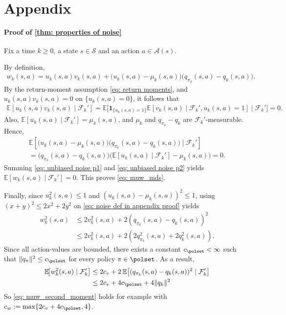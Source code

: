 \section*{Appendix}
\label{sec: Appendix}

\paragraph{Proof of \autoref{thm: properties of noise}}

Fix a time $k\ge 0$, a state $s \in \mathcal S$ and an action $a \in \mathcal A(s)$.

By definition,
\begin{align}
\label{eq: noise def in appendix proof}
w_k(s,a) = u_k(s,a) v_k(s,a) + \big( u_k(s,a)-\mu_k(s,a) \big) \big( q_{\pi_k}(s,a) - q_k(s,a) \big).
\end{align}
By the return-moment assumption \eqref{eq: return moments},
and $u_k(s,a) v_k(s,a) = 0$ on $\{u_k(s,a)=0\}$,
it follows that
\begin{align}
\label{eq: unbiased noise p1}
\mathbb E[ u_k(s,a) v_k(s,a) \mid \mathcal F_k']
=
\mathbb E \big[
    \mathbf 1_{\{u_k(s,a)=1\}} \mathbb E[ v_{k}(s,a) \mid \mathcal F_k', u_k(s,a)=1]
    \mid \mathcal F_k' \big]
= 0 .
\end{align}
Also, $\mathbb E[u_k(s,a) \mid \mathcal F_k'] = \mu_k(s,a)$, and $\mu_k$ and $q_{\pi_k}-q_k$ are $\mathcal F_k'$-measurable. Hence,
\begin{multline}
\label{eq: unbiased noise p2}
\mathbb E \!\left[
\bigl( u_k(s,a)-\mu_k(s,a) \bigr) \bigl( q_{\pi_k}(s,a)-q_k(s,a) \bigr)
\mid \mathcal F_k'
\right]
\\
=
\big( q_{\pi_k}(s,a)-q_k(s,a) \big)
\big( \mathbb E\!\left[ u_k(s,a) \mid \mathcal F_k'
\right]
-\mu_k(s,a) \big)
=
0 .
\end{multline}
Summing \eqref{eq: unbiased noise p1} and \eqref{eq: unbiased noise p2} yields $\mathbb E[w_k(s,a) \mid \mathcal F_k'] = 0$.
This proves \eqref{eq: muw_mds}.

Finally, since $u_k^2(s,a) \le 1$ and $(u_k(s,a) - \mu_k(s,a))^2 \le 1$,
using $(x+y)^2 \le 2 x^2 + 2 y^2$ on \eqref{eq: noise def in appendix proof} yields
\begin{align*}
w_k^2(s,a)
&\le 2 v_k^2(s,a) + 2 (q_{\pi_k}(s,a)-q_k(s,a) )^2
\\
&\le 2 v_k^2(s,a) + 2 ( 2 q_{\pi_k}^2(s,a) + 2 q_k^2(s,a) ) .
\end{align*}
Since all action-values are bounded,
there exists a constant $c_\polset < \infty$ such that $\|q_\pi\|^2 \leq c_\polset$ for every policy $\pi \in \polset$. As a result,
\begin{align*}
\mathbb E \!\big[ w_{k}^2(s,a) \mid \mathcal F'_k \big]
&\le
2 c_v + 2 \, \mathbb E \!\left[ ( q_{\pi_k}(s,a)-q_k(s,a) )^2 \mid \mathcal F'_k \right]
\\
&\le
2 c_v + 4 c_\polset + 4 \|q_k\|^2
\end{align*}
So \eqref{eq: muw_second_moment} holds for example with $c_w := \max \{ 2 c_v + 4 c_\polset, 4\}$.
\hfill \BlackBox

